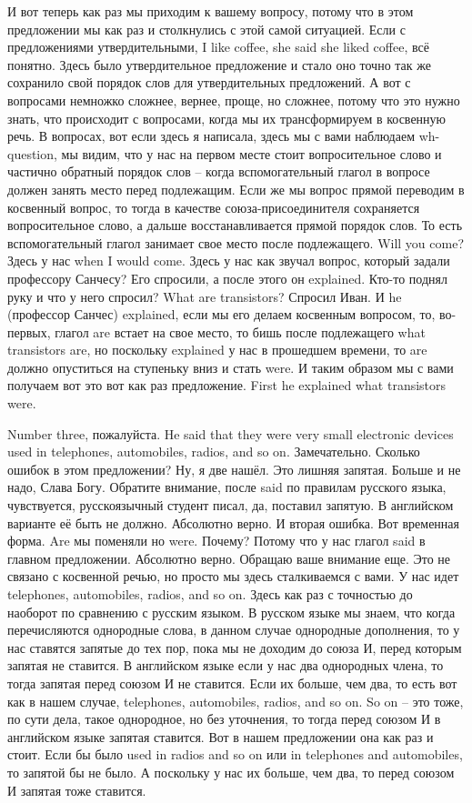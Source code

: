 \documentclass[main.tex]{subfiles}
\begin{document}
И вот теперь как раз мы приходим к вашему вопросу, потому что в этом предложении мы как раз и столкнулись с этой самой ситуацией.
Если с предложениями утвердительными, I like coffee, she said she liked coffee, всё понятно.
Здесь было утвердительное предложение и стало оно точно так же сохранило свой порядок слов для утвердительных предложений.
А вот с вопросами немножко сложнее, вернее, проще, но сложнее, потому что это нужно знать, что происходит с вопросами, когда мы их трансформируем в косвенную речь.
В вопросах, вот если здесь я написала, здесь мы с вами наблюдаем wh-question, мы видим, что у нас на первом месте стоит вопросительное слово и частично обратный порядок слов -- когда вспомогательный глагол в вопросе должен занять место перед подлежащим.
Если же мы вопрос прямой переводим в косвенный вопрос, то тогда в качестве союза-присоединителя сохраняется вопросительное слово, а дальше восстанавливается прямой порядок слов.
То есть вспомогательный глагол занимает свое место после подлежащего.
Will you come?
Здесь у нас when I would come.
Здесь у нас как звучал вопрос, который задали профессору Санчесу?
Его спросили, а после этого он explained.
Кто-то поднял руку и что у него спросил?
What are transistors?
Спросил Иван.
И he (профессор Санчес) explained, если мы его делаем косвенным вопросом, то, во-первых, глагол are встает на свое место, то бишь после подлежащего what transistors are, но поскольку explained у нас в прошедшем времени, то are должно опуститься на ступеньку вниз и стать were.
И таким образом мы с вами получаем вот это вот как раз предложение.
First he explained what transistors were.

Number three, пожалуйста.
He said that they were very small electronic devices used in telephones, automobiles, radios, and so on.
Замечательно.
Сколько ошибок в этом предложении?
Ну, я две нашёл.
Это лишняя запятая.
Больше и не надо, Слава Богу.
Обратите внимание, после said по правилам русского языка, чувствуется, русскоязычный студент писал, да, поставил запятую.
В английском варианте её быть не должно.
Абсолютно верно.
И вторая ошибка.
Вот временная форма.
Are мы поменяли но were.
Почему?
Потому что у нас глагол said в главном предложении.
Абсолютно верно.
Обращаю ваше внимание еще.
Это не связано с косвенной речью, но просто мы здесь сталкиваемся с вами.
У нас идет telephones, automobiles, radios, and so on.
Здесь как раз с точностью до наоборот по сравнению с русским языком.
В русском языке мы знаем, что когда перечисляются однородные слова, в данном случае однородные дополнения, то у нас ставятся запятые до тех пор, пока мы не доходим до союза И, перед которым запятая не ставится.
В английском языке если у нас два однородных члена, то тогда запятая перед союзом И не ставится.
Если их больше, чем два, то есть вот как в нашем случае, telephones, automobiles, radios, and so on.
So on -- это тоже, по сути дела, такое однородное, но без уточнения, то тогда перед союзом И в английском языке запятая ставится.
Вот в нашем предложении она как раз и стоит.
Если бы было used in radios and so on или in telephones and automobiles, то запятой бы не было.
А поскольку у нас их больше, чем два, то перед союзом И запятая тоже ставится.
\end{document}
